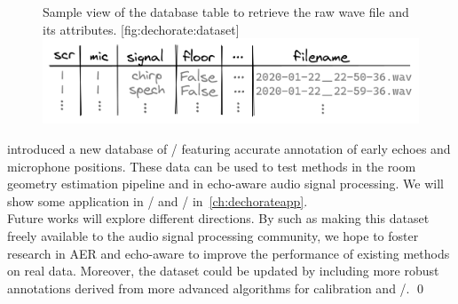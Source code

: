 \begin{figure}
    \begin{sidecaption}[]{
            Sample view of the database table to retrieve the raw wave file and its attributes.
        }[fig:dechorate:dataset]
        \centering
        \includegraphics[width=\linewidth]{figures/dechorate/database.png}
    \end{sidecaption}
\end{figure}

 introduced a new database of \RIRdef/ featuring accurate annotation of early echoes and microphone positions.
These data can be used to test methods in the room geometry estimation pipeline and in echo-aware audio signal processing.
We will show some application in \SE/ and \RooGE/ in~\cref{ch:dechorateapp}.
\\Future works will explore different directions. By such as making this dataset freely available to the audio signal processing community, we hope to foster research in AER and echo-aware to improve the performance of existing methods on real data.
Moreover, the dataset could be updated by including more robust annotations derived from more advanced algorithms for calibration and \AER/.
\qed